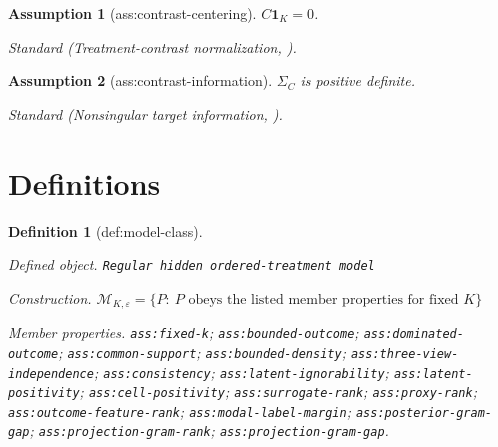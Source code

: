\documentclass{article}
\newtheorem{assumption}{Assumption}
\newtheorem{definition}{Definition}
\begin{document}
\begin{assumption}[ass:contrast-centering]\label{ass:contrast-centering}
\(C\mathbf 1_K=0\).
\par\smallskip\noindent\emph{Standard} (Treatment-contrast normalization, \cite{BodoryBusshoffLechner2022}).
\end{assumption}

\begin{assumption}[ass:contrast-information]\label{ass:contrast-information}
\(\Sigma_C\) is positive definite.
\par\smallskip\noindent\emph{Standard} (Nonsingular target information, \cite{TsiatisMa2004}).
\end{assumption}

\section{Definitions}

\begin{definition}[def:model-class]\label{def:model-class}
\par\smallskip\noindent\emph{Defined object.} \texttt{Regular hidden ordered-\allowbreak{}treatment model}
\par\smallskip\noindent\emph{Construction.} \(\mathcal M_{K,\varepsilon}=\{P:\ P\text{ obeys the listed member properties for fixed }K\}\)
\par\smallskip\noindent\emph{Member properties.} \texttt{ass:\allowbreak{}fixed-\allowbreak{}k}; \texttt{ass:\allowbreak{}bounded-\allowbreak{}outcome}; \texttt{ass:\allowbreak{}dominated-\allowbreak{}outcome}; \texttt{ass:\allowbreak{}common-\allowbreak{}support}; \texttt{ass:\allowbreak{}bounded-\allowbreak{}density}; \texttt{ass:\allowbreak{}three-\allowbreak{}view-\allowbreak{}independence}; \texttt{ass:\allowbreak{}consistency}; \texttt{ass:\allowbreak{}latent-\allowbreak{}ignorability}; \texttt{ass:\allowbreak{}latent-\allowbreak{}positivity}; \texttt{ass:\allowbreak{}cell-\allowbreak{}positivity}; \texttt{ass:\allowbreak{}surrogate-\allowbreak{}rank}; \texttt{ass:\allowbreak{}proxy-\allowbreak{}rank}; \texttt{ass:\allowbreak{}outcome-\allowbreak{}feature-\allowbreak{}rank}; \texttt{ass:\allowbreak{}modal-\allowbreak{}label-\allowbreak{}margin}; \texttt{ass:\allowbreak{}posterior-\allowbreak{}gram-\allowbreak{}gap}; \texttt{ass:\allowbreak{}projection-\allowbreak{}gram-\allowbreak{}rank}; \texttt{ass:\allowbreak{}projection-\allowbreak{}gram-\allowbreak{}gap}.
\end{definition}
\end{document}
